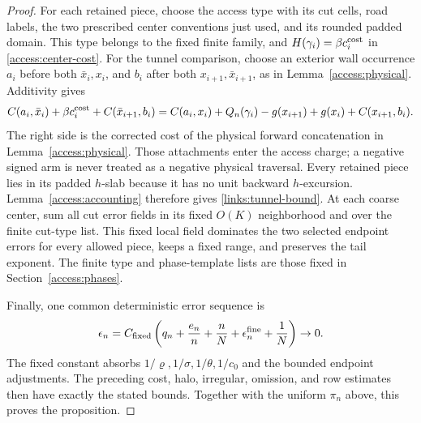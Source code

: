 \begin{proof}
For each retained piece, choose the access type with its cut cells,
road labels, the two prescribed center conventions just used, and its
rounded padded domain. This type belongs to the fixed finite family,
and \(H(\gamma_i)=\beta c_i^{\rm cost}\) in
\eqref{access:center-cost}. For the tunnel comparison, choose an exterior
wall occurrence \(a_i\)
before both \(\bar x_i,x_i\), and \(b_i\) after both
\(x_{i+1},\bar x_{i+1}\), as in Lemma~\ref{access:physical}.
Additivity gives
\[
 C(a_i,\bar x_i)+\beta c_i^{\rm cost}+C(\bar x_{i+1},b_i)
 =C(a_i,x_i)+Q_n(\gamma_i)-g(x_{i+1})+g(x_i)
                                      +C(x_{i+1},b_i).
\]
The right side is the corrected cost of the physical forward
concatenation in Lemma~\ref{access:physical}. Those attachments enter
the access charge; a negative signed arm is never treated as a negative
physical traversal. Every retained piece lies in its padded \(h\)-slab
because it has no unit backward
\(h\)-excursion. Lemma~\ref{access:accounting} therefore gives
\eqref{links:tunnel-bound}. At each coarse center, sum all cut error
fields in its fixed \(O(K)\) neighborhood and over the finite cut-type
list. This fixed local field dominates the two selected endpoint errors
for every allowed piece, keeps a fixed range, and preserves the tail
exponent. The finite type and phase-template lists are those fixed in
Section~\ref{access:phases}.

Finally, one common deterministic error sequence is
\[
 \epsilon_n=C_{\rm fixed}\left(q_n+\frac{e_n}{n}+\frac nN
                         +\epsilon_n^{\rm fine}+\frac1N\right)\to0.
\]
The fixed constant absorbs \(1/\varrho,1/\sigma,1/\theta,1/c_0\)
and the bounded endpoint adjustments. The preceding cost, halo,
irregular, omission, and row estimates then have exactly the stated
bounds. Together with the uniform \(\pi_n\) above, this proves the
proposition.
\end{proof}


